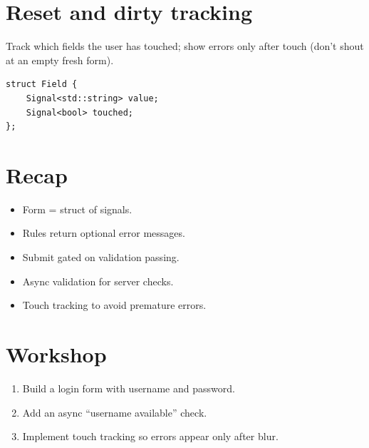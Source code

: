 \section{Reset and dirty tracking}

Track which fields the user has touched; show errors only
after touch (don't shout at an empty fresh form).

\begin{lstlisting}
struct Field {
    Signal<std::string> value;
    Signal<bool> touched;
};
\end{lstlisting}

\section{Recap}

\begin{recap}
\begin{itemize}[leftmargin=*]
  \item Form = struct of signals.
  \item Rules return optional error messages.
  \item Submit gated on validation passing.
  \item Async validation for server checks.
  \item Touch tracking to avoid premature errors.
\end{itemize}
\end{recap}

\section*{Workshop}

\begin{enumerate}[leftmargin=*]
  \item Build a login form with username and password.
  \item Add an async ``username available'' check.
  \item Implement touch tracking so errors appear only
    after blur.
\end{enumerate}
